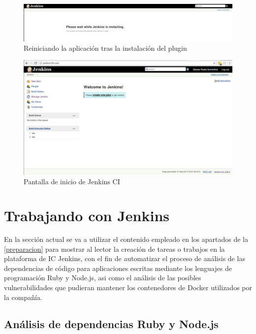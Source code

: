 \begin{figure}[H]
	\centering
	\includegraphics[width=1.0\linewidth]
	{desarrollo/figuras/jenkins_09.png}
	\caption{Reiniciando la aplicación tras la instalación del plugin}
	\label{jenkins_09}
\end{figure}

\begin{figure}[htbp]
	\centering
	\includegraphics[width=1.0\linewidth]
	{desarrollo/figuras/jenkins_10.png}
	\caption{Pantalla de inicio de Jenkins \gls{CI}}
	\label{jenkins_10}
\end{figure}

\section{Trabajando con Jenkins}\label{trabajando_jenkins}

En la sección actual se va a utilizar el contenido empleado en los apartados de la \autoref{preparacion} para mostrar al lector la creación de tareas o trabajos en la plataforma de \gls{IC} Jenkins, con el fin de automatizar el proceso de análisis de las dependencias de código para aplicaciones escritas mediante los lenguajes de programación Ruby y Node.js, asi como el análisis de las posibles vulnerabilidades que pudieran mantener los contenedores de Docker utilizados por la compañía.

\subsection{Análisis de dependencias Ruby y Node.js}

